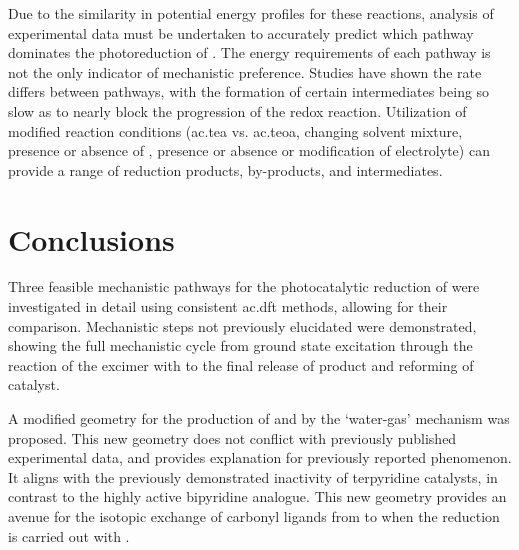 Due to the similarity in potential energy profiles for these reactions, analysis of experimental data must be undertaken to accurately predict which pathway dominates the photoreduction of . The energy requirements of each pathway is not the only indicator of mechanistic preference. Studies have shown the rate differs between pathways, with the formation of certain intermediates being so slow as to nearly block the progression of the redox reaction. Utilization of modified reaction conditions (\gls{ac.tea} vs. \gls{ac.teoa}, changing solvent mixture, presence or absence of , presence or absence or modification of electrolyte) can provide a range of reduction products, by-products, and intermediates\autocite{hawecker1983, hawecker1986, sullivan1985, hayashi2003, morris2009, morimoto2013}.

\section{Conclusions} 

Three feasible mechanistic pathways for the photocatalytic reduction of  were investigated in detail using consistent \gls{ac.dft} methods, allowing for their comparison. Mechanistic steps not previously elucidated were demonstrated, showing the full mechanistic cycle from ground state excitation through the reaction of the excimer with  to the final release of product and reforming of catalyst. 

A modified geometry for the production of  and  by the `water-gas' mechanism was proposed. This new geometry does not conflict with previously published experimental data, and provides explanation for previously reported phenomenon. It aligns with the previously demonstrated inactivity of terpyridine catalysts, in contrast to the highly active bipyridine analogue. This new geometry provides an avenue for the isotopic exchange of carbonyl ligands from  to  when the reduction is carried out with . 

